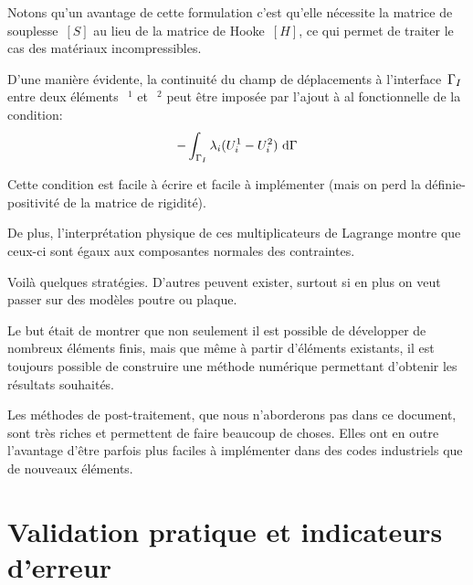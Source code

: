 \begin{description}
	Notons qu'un avantage de cette formulation c'est qu'elle nécessite la matrice de souplesse~$[S]$ au lieu de la matrice de Hooke~$[H]$, ce qui permet de traiter le cas des matériaux incompressibles. 
	
	\item[\textcolorblue{Multiplicateurs de Lagrange:}]
	
	D'une manière évidente, la continuité du champ de déplacements 	à l'interface~$\Gamma_I$ entre deux éléments~$~^1$ et~$~^2$ peut être imposée par l'ajout à al fonctionnelle de la condition: 
	\begin{equation} -\dint_{\li} \lambda_i(U_i^1-U_i^2)\ \dd\Gamma \end{equation}

	Cette condition est facile à écrire et facile à implémenter (mais on perd la 	définie-positivité de la matrice de rigidité).
	
	De plus, l'interprétation physique de ces multiplicateurs de Lagrange montre 	que ceux-ci sont égaux aux composantes normales des contraintes.
\end{description}
\medskip
Voilà quelques stratégies. D'autres peuvent exister, surtout si en plus on veut passer sur des modèles poutre ou plaque.

Le but était de montrer que non seulement il est possible de développer de nombreux éléments finis, mais que même à partir d'éléments existants, il est toujours possible de construire une méthode numérique permettant d'obtenir les résultats souhaités.

Les méthodes de post-traitement, que nous n'aborderons pas dans ce document, sont très riches et permettent de faire beaucoup de choses. Elles ont en outre l'avantage d'être parfois plus faciles à implémenter dans des codes industriels que de nouveaux éléments.

\medskip
\section{Validation pratique et indicateurs d'erreur}\label{Sec-ValidEF}

